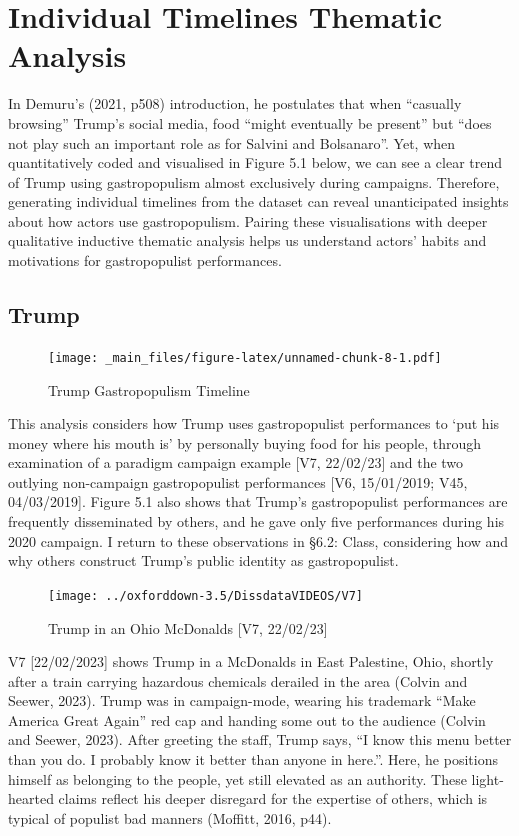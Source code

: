 \documentclass[a4paper, nobind]{templates/ociamthesis}
\begin{document}
\hypertarget{individual-timelines-thematic-analysis}{%
\chapter{Individual Timelines Thematic Analysis}\label{individual-timelines-thematic-analysis}}

In Demuru's (2021, p508) introduction, he postulates that when ``casually browsing'' Trump's social media, food ``might eventually be present'' but ``does not play such an important role as for Salvini and Bolsanaro''. Yet, when quantitatively coded and visualised in Figure 5.1 below, we can see a clear trend of Trump using gastropopulism almost exclusively during campaigns. Therefore, generating individual timelines from the dataset can reveal unanticipated insights about how actors use gastropopulism. Pairing these visualisations with deeper qualitative inductive thematic analysis helps us understand actors' habits and motivations for gastropopulist performances.

\hypertarget{trump}{%
\section{Trump}\label{trump}}

\begin{figure}
\centering
\texttt{[image: \_main\_files/figure-latex/unnamed-chunk-8-1.pdf]}
\caption{\label{fig:unnamed-chunk-8}Trump Gastropopulism Timeline}
\end{figure}

This analysis considers how Trump uses gastropopulist performances to `put his money where his mouth is' by personally buying food for his people, through examination of a paradigm campaign example {[}V7, 22/02/23{]} and the two outlying non-campaign gastropopulist performances {[}V6, 15/01/2019; V45, 04/03/2019{]}. Figure 5.1 also shows that Trump's gastropopulist performances are frequently disseminated by others, and he gave only five performances during his 2020 campaign. I return to these observations in §6.2: Class, considering how and why others construct Trump's public identity as gastropopulist.

\begin{figure}
\texttt{[image: ../oxforddown-3.5/DissdataVIDEOS/V7]} \caption{Trump in an Ohio McDonalds [V7, 22/02/23]}\label{fig:unnamed-chunk-9}
\end{figure}

V7 {[}22/02/2023{]} shows Trump in a McDonalds in East Palestine, Ohio, shortly after a train carrying hazardous chemicals derailed in the area (Colvin and Seewer, 2023). Trump was in campaign-mode, wearing his trademark ``Make America Great Again'' red cap and handing some out to the audience (Colvin and Seewer, 2023). After greeting the staff, Trump says, ``I know this menu better than you do. I probably know it better than anyone in here.''. Here, he positions himself as belonging to the people, yet still elevated as an authority. These light-hearted claims reflect his deeper disregard for the expertise of others, which is typical of populist bad manners (Moffitt, 2016, p44).
\end{document}
